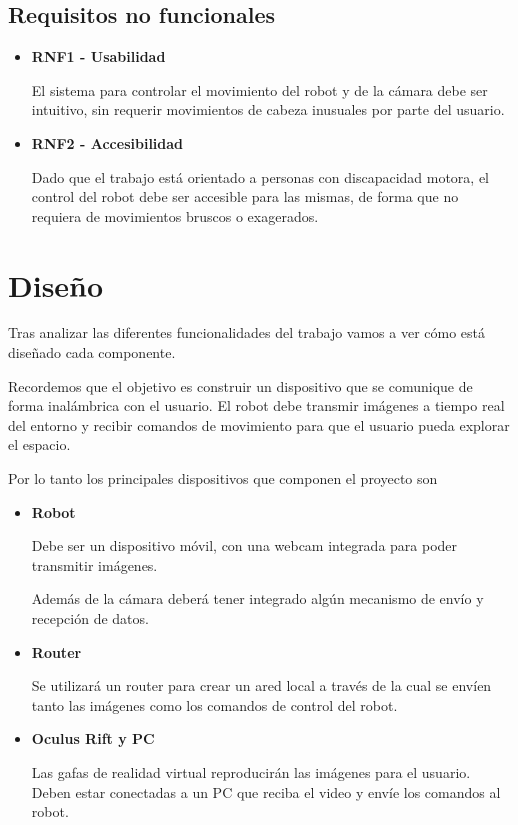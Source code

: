 \documentclass[twoside, 12pt]{epstfg}
\begin{document}
\section{Requisitos no funcionales}

\begin{itemize}
	\item \textbf{RNF1 - Usabilidad}
	
	
	El sistema para controlar el movimiento del robot y de la cámara debe ser intuitivo, sin requerir movimientos de cabeza inusuales por parte del usuario.
	
	
	
	\item \textbf{RNF2 - Accesibilidad}
	
	Dado que el trabajo está orientado a personas con discapacidad motora, el control del robot debe ser accesible para las mismas, de forma que no requiera de movimientos bruscos o exagerados. 
\end{itemize}

\newpage
\chapter{Diseño}

Tras analizar las diferentes funcionalidades del trabajo vamos a ver cómo está diseñado cada componente.

Recordemos que el objetivo es construir un dispositivo que se comunique de forma inalámbrica con el usuario. El robot debe transmir imágenes a tiempo real del entorno y recibir comandos de movimiento para que el usuario pueda explorar el espacio.

Por lo tanto los principales dispositivos que componen el proyecto son 
\begin{itemize}
	\item \textbf{Robot} 
	
		Debe ser un dispositivo móvil, con una webcam integrada para poder transmitir imágenes.
		
		Además de la cámara deberá tener integrado algún mecanismo de envío y recepción de datos.
	\item \textbf{Router}
	
		Se utilizará un router para crear un ared local a través de la cual se envíen tanto las imágenes como los comandos de control del robot.
	\item \textbf{Oculus Rift y PC}
		
		Las gafas de realidad virtual reproducirán las imágenes para el usuario. Deben estar conectadas a un PC que reciba el video y envíe los comandos al robot.
		
\end{itemize}
\end{document}
